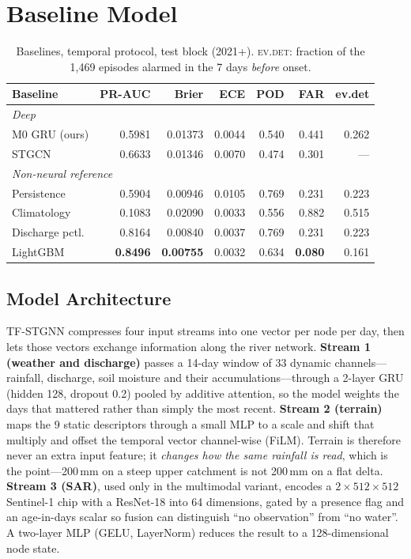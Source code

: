 \documentclass[sigconf]{acmart}
\begin{document}
\section{Baseline Model}

\begin{table}[t]
\caption{Baselines, temporal protocol, test block (2021+). \textsc{ev.det}: fraction of the 1,469 episodes alarmed in the 7 days \emph{before} onset.}
\label{tab:baselines}
\scriptsize
\setlength{\tabcolsep}{3pt}
\begin{tabular}{lrrrrrr}
\toprule
Baseline & PR-AUC & Brier & ECE & POD & FAR & ev.det \\
\midrule
\multicolumn{7}{l}{\emph{Deep}} \\
M0 GRU (ours)   & 0.5981 & 0.01373 & 0.0044 & 0.540 & 0.441 & 0.262 \\
STGCN~\cite{STGCN2018} & 0.6633 & 0.01346 & 0.0070 & 0.474 & 0.301 & --- \\
\midrule
\multicolumn{7}{l}{\emph{Non-neural reference}} \\
Persistence     & 0.5904 & 0.00946 & 0.0105 & 0.769 & 0.231 & 0.223 \\
Climatology     & 0.1083 & 0.02090 & 0.0033 & 0.556 & 0.882 & 0.515 \\
Discharge pctl. & 0.8164 & 0.00840 & 0.0037 & 0.769 & 0.231 & 0.223 \\
LightGBM        & \textbf{0.8496} & \textbf{0.00755} & 0.0032 & 0.634 & \textbf{0.080} & 0.161 \\
\bottomrule
\end{tabular}
\end{table}

\subsection{Model Architecture}

TF-STGNN compresses four input streams into one vector per node per day, then lets those vectors exchange information along the river network. \textbf{Stream 1 (weather and discharge)} passes a 14-day window of 33 dynamic channels---rainfall, discharge, soil moisture and their accumulations---through a 2-layer GRU (hidden 128, dropout 0.2) pooled by additive attention, so the model weights the days that mattered rather than simply the most recent. \textbf{Stream 2 (terrain)} maps the 9 static descriptors through a small MLP to a scale and shift that multiply and offset the temporal vector channel-wise (FiLM). Terrain is therefore never an extra input feature; it \emph{changes how the same rainfall is read}, which is the point---200\,mm on a steep upper catchment is not 200\,mm on a flat delta. \textbf{Stream 3 (SAR)}, used only in the multimodal variant, encodes a $2{\times}512{\times}512$ Sentinel-1 chip with a ResNet-18 into 64 dimensions, gated by a presence flag and an age-in-days scalar so fusion can distinguish ``no observation'' from ``no water''. A two-layer MLP (GELU, LayerNorm) reduces the result to a 128-dimensional node state.
\end{document}
